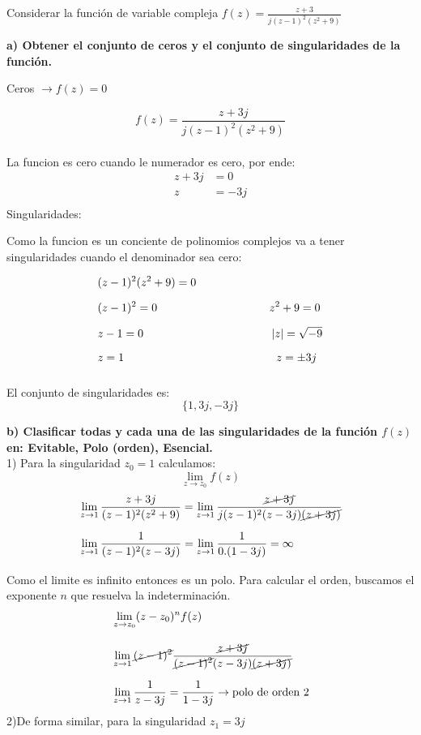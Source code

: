 \documentclass[12pt]{report}
\begin{document}
\chapter{}%

Considerar la función de variable compleja $f(z) =\frac{z + 3}{j(z - 1)^2(z^2 + 9)}$

\textbf{a) Obtener el conjunto de ceros y el conjunto de singularidades de la función.}

Ceros $\rightarrow f(z)=0$

$$f(z)=\frac{z + 3j}{j(z - 1)^2(z^2 + 9)}$$\\
La funcion es cero cuando le numerador es cero, por ende:
\begin{align*}
z+3j&=0\\[6pt]
z&=-3j\\[6pt]
\end{align*}
Singularidades:

Como la funcion es un conciente de polinomios complejos va a tener singularidades cuando el denominador sea cero:

\begin{align*}
    &(z-1)^2(z^2+9)=0\\[6pt]
    &(z-1)^2=0 \hspace{3.5cm}    z^2+9=0\\[6pt]
    &z-1=0     \hspace{4cm}   |z|=\sqrt{-9}\\[6pt]
    &z=1       \hspace{4.75cm}  z=\pm3j\\[6pt]
\end{align*}

El conjunto de singularidades es: $$\{1,3j,-3j\}$$

\textbf{b) Clasificar todas y cada una de las singularidades de la función $f(z)$ en: Evitable, Polo (orden), Esencial.}\\[6pt]
1) Para la singularidad $z_0=1$ calculamos: $$\lim_{z \to z_0}f(z)$$
\begin{align*}
&\lim_{z \to 1}\frac{z+3j}{(z - 1)^2(z^2 + 9)}=\lim_{z \to 1}\frac{\cancel{z+3j}}{j(z - 1)^2(z-3j)\cancel{(z+3j)}}\\[6pt]
&\lim_{z \to 1}\frac{1}{(z - 1)^2(z-3j)}=\lim_{z \to 1}\frac{1}{0.(1-3j)}=\infty\\[6pt]
\end{align*}
Como el limite es infinito entonces es un polo. Para calcular el orden, buscamos el exponente $n$ que resuelva
la indeterminación.\\
\begin{align*}
&\lim_{z \to z_0}(z-z_0)^n f(z)\\[10pt]
&\lim_{z \to 1}\cancel{(z - 1)^2}\frac{\cancel{z+3j}}{\cancel{(z - 1)^2}(z-3j)\cancel{(z+3j)}}\\[6pt]
&\lim_{z \to 1}\frac{1}{z-3j}=\frac{1}{1-3j}\rightarrow \text{polo de orden 2}\\
\end{align*}
2)De forma similar, para la singularidad $z_1=3j$
\end{document}
